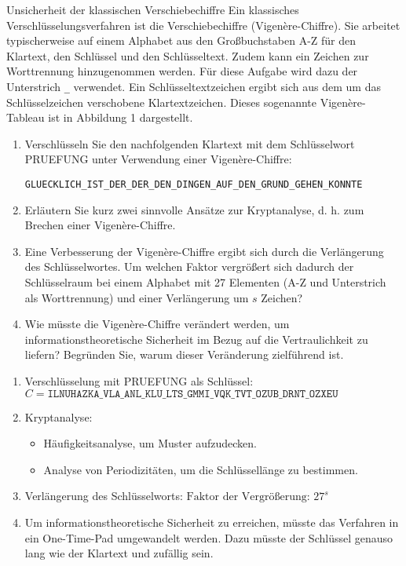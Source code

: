 \documentclass{article}
\begin{document}
\setcounter{subsection}{112}
\begin{exercise}{Unsicherheit der klassischen Verschiebechiffre}\label{ex:vigenere}
  Ein klassisches Verschlüsselungsverfahren ist die Verschiebechiffre (Vigenère-Chiffre). Sie arbeitet typischerweise auf einem Alphabet aus den Großbuchstaben A-Z für den Klartext, den Schlüssel und den Schlüsseltext. Zudem kann ein Zeichen zur Worttrennung hinzugenommen werden. Für diese Aufgabe wird dazu der Unterstrich \texttt{\_} verwendet. Ein Schlüsseltextzeichen ergibt sich aus dem um das Schlüsselzeichen verschobene Klartextzeichen. Dieses sogenannte Vigenère-Tableau ist in Abbildung 1 dargestellt.
  
  \begin{enumerate}
    \item Verschlüsseln Sie den nachfolgenden Klartext mit dem Schlüsselwort PRUEFUNG unter Verwendung einer Vigenère-Chiffre:
    \begin{center}
        \texttt{GLUECKLICH\_IST\_DER\_DER\_DEN\_DINGEN\_AUF\_DEN\_GRUND\_GEHEN\_KONNTE}
    \end{center}
    \item Erläutern Sie kurz zwei sinnvolle Ansätze zur Kryptanalyse, d. h. zum Brechen einer Vigenère-Chiffre.
    \item Eine Verbesserung der Vigenère-Chiffre ergibt sich durch die Verlängerung des Schlüsselwortes. Um welchen Faktor vergrößert sich dadurch der Schlüsselraum bei einem Alphabet mit 27 Elementen (A-Z und Unterstrich als Worttrennung) und einer Verlängerung um $s$ Zeichen?
    \item Wie müsste die Vigenère-Chiffre verändert werden, um informationstheoretische Sicherheit im Bezug auf die Vertraulichkeit zu liefern? Begründen Sie, warum dieser Veränderung zielführend ist.
  \end{enumerate}

  \begin{solution}
    \begin{enumerate}
        \item Verschlüsselung mit PRUEFUNG als Schlüssel: $C = \texttt{ILNUHAZKA\_VLA\_ANL\_KLU\_LTS\_GMMI\_VQK\_TVT\_OZUB\_DRNT\_OZXEU}$
        \item Kryptanalyse:
          \begin{itemize}
              \item Häufigkeitsanalyse, um Muster aufzudecken.
              \item Analyse von Periodizitäten, um die Schlüssellänge zu bestimmen.
          \end{itemize}
        \item Verlängerung des Schlüsselworts: $\text{Faktor der Vergrößerung: } 27^s$
        \item Um informationstheoretische Sicherheit zu erreichen, müsste das Verfahren in ein One-Time-Pad umgewandelt werden. Dazu müsste der Schlüssel genauso lang wie der Klartext und zufällig sein.
    \end{enumerate}
  \end{solution}
\end{exercise}
\end{document}
